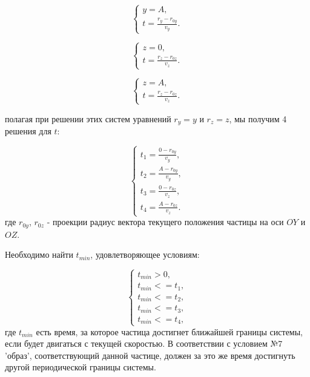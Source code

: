 \documentclass[a4paper]{article}
\begin{document}
\begin{equation}
    \begin{cases}
        y = A,
        \\
        t = \displaystyle\frac{r_y - r_{0y}}{v_y}.
    \end{cases}
\end{equation}

\begin{equation}
    \begin{cases}
        z = 0,
        \\
        t = \displaystyle\frac{r_z - r_{0z}}{v_z}.
    \end{cases}
\end{equation}

\begin{equation}
    \begin{cases}
        z = A,
        \\
        t = \displaystyle\frac{r_z - r_{0z}}{v_z}.
    \end{cases}
\end{equation}

полагая при решении этих систем уравнений $ r_y = y $ и $ r_z = z $, мы получим 4 решения для  $t$:

\begin{equation}\label{eq:t_end}
    \begin{cases}
        t_1 = \displaystyle\frac{0 - r_{0y}}{v_y},
        \\
        t_2 = \displaystyle\frac{A - r_{0y}}{v_y},
        \\
        t_3 = \displaystyle\frac{0 - r_{0z}}{v_z},
        \\
        t_4 = \displaystyle\frac{A - r_{0z}}{v_z}.
    \end{cases}
\end{equation}
где $ r_{0y} $, $ r_{0z} $ - проекции радиус вектора текущего положения частицы на оси $ OY $ и $ OZ $.

Необходимо найти $ t_{min} $, удовлетворяющее условиям:

\begin{equation}\label{eq:t_min}
    \begin{cases}
        t_{min} > 0,
        \\
        t_{min} <= t_1,
        \\
        t_{min} <= t_2,
        \\
        t_{min} <= t_3,
        \\
        t_{min} <= t_4,
    \end{cases}
\end{equation}
где $ t_{min} $ есть время, за которое частица достигнет ближайшей границы системы, если будет двигаться с текущей скоростью. В соответствии с условием №7 'образ', соответствующий данной частице, должен  за это же время достигнуть другой периодической границы системы.
\end{document}
